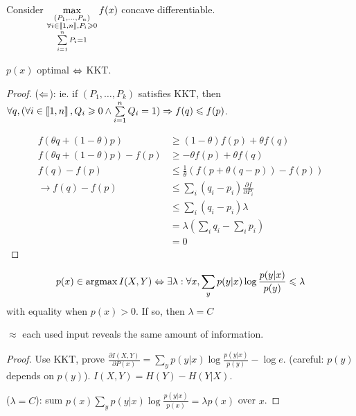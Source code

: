 \begin{theorem}
    Consider $\max\limits_{\substack{(P_1,\ldots,P_n)\\\forall i\in\left\llbracket 1,n \right\rrbracket, P_i \geqslant 0\\\sum\limits_{i=1}^n P_i = 1}} f(x)$ concave differentiable.
    
    $p(x)$ optimal $\Leftrightarrow$ KKT.
\end{theorem}
\begin{proof}
    ($\Leftarrow$): ie. if $(P_1,\ldots,P_k)$ satisfies KKT, then $\forall q, (\forall i\in\left\llbracket 1,n \right\rrbracket,Q_i \geqslant 0\wedge \sum\limits_{i=1}^n Q_i = 1) \Rightarrow f(q) \leqslant f(p)$.
    
    \[
        \begin{aligned}
            f(\theta q + (1-\theta)p) &\geqslant (1-\theta)f(p) + \theta f(q)\\
            f(\theta q + (1-\theta)p) - f(p) &\geqslant -\theta f(p) + \theta f(q)\\
            f(q) - f(p) &\leqslant \frac{1}{\theta}\left( f(p+\theta(q-p)) - f(p) \right)\\
            \to f(q) - f(p) &\leqslant \sum\limits_i (q_i - p_i) \frac{\partial f}{\partial P_i}\\
            &\leqslant \sum\limits_i(q_i-p_i)\lambda\\
            &= \lambda \left(\sum\limits_i q_i - \sum\limits_i p_i\right)\\
            &= 0
        \end{aligned}            
    \]
\end{proof}

\begin{theorem}
    \[
        p(x) \in \operatorname{argmax} I(X,Y) \Leftrightarrow \exists \lambda: \forall x, \sum\limits_y p(y\vert x) \log \frac{p(y\vert x)}{p(y)} \leqslant \lambda
    \]
    with equality when $p(x) > 0$. If so, then $\lambda = C$
\end{theorem}
$\approx$ each used input reveals the same amount of information.
\begin{proof}
    Use KKT, prove $\frac{\partial I(X,Y)}{\partial P(x)} = \sum\limits_y p(y\vert x) \log \frac{p(y\vert x)}{p(y)}-\log e$. (careful: $p(y)$ depends on $p(y)$). $I(X,Y) = H(Y) - H(Y\vert X)$.

    \bigskip
    
    ($\lambda = C$): sum $p(x) \sum\limits_y p(y\vert x) \log \frac{p(y\vert x)}{p(x)} = \lambda p(x)$ over $x$.    
\end{proof}

